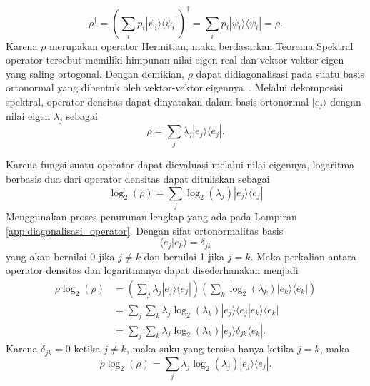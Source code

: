 \begin{equation}
\rho^\dagger
=
\left(
\sum_i p_i |\psi_i\rangle\langle\psi_i|
\right)^\dagger
=
\sum_i p_i |\psi_i\rangle\langle\psi_i|
=
\rho.
\end{equation}
Karena $\rho$ merupakan operator Hermitian, maka berdasarkan Teorema Spektral operator tersebut memiliki himpunan nilai eigen real dan vektor-vektor eigen yang saling ortogonal. Dengan demikian, $\rho$ dapat didiagonalisasi pada suatu basis ortonormal yang dibentuk oleh vektor-vektor eigennya~\cite{kumar_family_2025}. Melalui dekomposisi spektral, operator densitas dapat dinyatakan dalam basis ortonormal $|e_j\rangle$ dengan nilai eigen $\lambda_j$ sebagai
\begin{equation}
    \rho = \sum_j \lambda_j |e_j\rangle \langle e_j|.
\end{equation}

Karena fungsi suatu operator dapat dievaluasi melalui nilai eigennya, logaritma berbasis dua dari operator densitas dapat dituliskan sebagai
\begin{equation}
    \log_2(\rho) = \sum_j \log_2 (\lambda_j) |e_j\rangle \langle e_j|
\end{equation}
Menggunakan proses penurunan lengkap yang ada pada Lampiran \ref{app:diagonalisasi_operator}. Dengan sifat ortonormalitas basis
\begin{equation}
    \langle e_j | e_k \rangle = \delta_{jk}
\end{equation}
yang akan bernilai 0 jika $j \neq k$ dan bernilai 1 jika $j = k$. Maka perkalian antara operator densitas dan logaritmanya dapat disederhanakan menjadi
\begin{equation}
\begin{split}
    \rho \log_2(\rho) &= \left(\sum_j \lambda_j |e_j\rangle \langle e_j|\right) \left( \sum_k \log_2 (\lambda_k) |e_k\rangle \langle e_k|\right) \\
    &= \sum_j \sum_k \lambda_j \log_2(\lambda_k) |e_j\rangle \langle e_j | e_k\rangle \langle e_k| \\
    &= \sum_j \sum_k \lambda_j \log_2(\lambda_k) |e_j\rangle \delta_{jk} \langle e_k|.
\end{split}
\end{equation}
Karena $\delta_{jk}=0$ ketika $j \neq k$, maka suku yang tersisa hanya ketika $j = k$, maka
\begin{equation}
\rho \log_2(\rho) = \sum_j \lambda_j \log_2(\lambda_j) |e_j\rangle \langle e_j|.
\end{equation}

